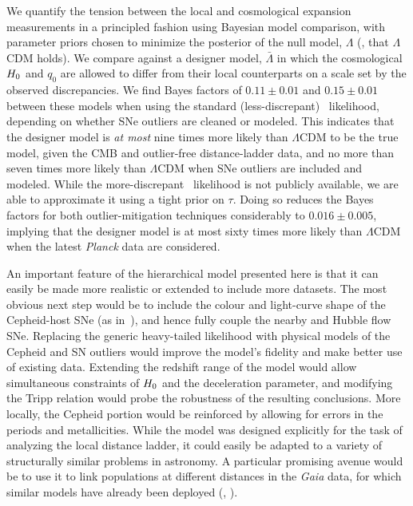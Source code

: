 \documentclass[a4paper,fleqn,usenatbib]{mnras}
\newcommand{\mdiff}{\bar{\Lambda}}
\newcommand{\decel}{\ensuremath{q_0}}
\begin{document}
{We quantify the tension between the local and cosmological expansion measurements in a principled fashion using Bayesian model comparison, with parameter priors chosen to minimize the posterior of the null model, $\Lambda$ (\ie, that $\Lambda$CDM holds). We compare against a designer model, $\mdiff$ in which the cosmological $H_0$ and $\decel$ are allowed to differ from their local counterparts on a scale set by the observed discrepancies. We find Bayes factors of $0.11 \pm 0.01$ and $0.15 \pm 0.01$ between these models when using the standard (less-discrepant)~\citet{Planck_XIII:2016} likelihood, depending on whether SNe outliers are cleaned or modeled. This indicates that the designer model is {\em at most} nine times more likely than $\Lambda$CDM to be the true model, given the CMB and outlier-free distance-ladder data, and no more than seven times more likely than $\Lambda$CDM when SNe outliers are included and modeled. While the more-discrepant~\citet{Planck_Int_XLVI:2016} likelihood is not publicly available, we are able to approximate it using a tight prior on $\tau$. Doing so reduces the Bayes factors for both outlier-mitigation techniques considerably to $0.016 \pm 0.005$, implying that the designer model is at most sixty times more likely than $\Lambda$CDM when the latest {\it Planck} data are considered.

An important feature of the hierarchical model presented here is that it can easily be made more realistic or extended to include more datasets. The most obvious next step would be to include the colour and light-curve shape of the Cepheid-host SNe (as in~\cite{Zhang_etal:2017}), and hence fully couple the nearby and Hubble flow SNe. Replacing the generic heavy-tailed likelihood with physical models of the Cepheid and SN outliers would improve the model's fidelity and make better use of existing data. Extending the redshift range of the model would allow simultaneous constraints of $H_0$ and the deceleration parameter, and modifying the Tripp relation would probe the robustness of the resulting conclusions.  More locally, the Cepheid portion would be reinforced by allowing for errors in the periods and metallicities.  While the model was designed explicitly for the task of analyzing the local distance ladder, it could easily be adapted to a variety of structurally similar problems in astronomy.  A particular promising avenue would be to use it to link populations at different distances in the {\em Gaia} data, for which similar models have already been deployed (\eg, \citealt{Sesar_etal:2016}).  

}
\end{document}
